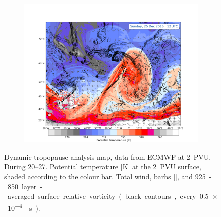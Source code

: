 \begin{figure}
\begin{subfigure}[b]{\textwidth}
		\includegraphics[trim={4.2cm 0cm 4.3cm 36.8cm},clip,
		width=\textwidth]{./fig_DynTropo/20161225_12}
	\end{subfigure}
	\caption{Dynamic tropopause analysis map, data from ECMWF at \SI{2}{PVU}. During \SIrange{20}{27}{\dec}. Potential temperature [K] at the \SI{2}{PVU} surface, shaded according to the colour bar. Total wind, barbs [\SI{}{\mPs}], and \SI{925}-\SI{850}{\hPa} layer-averaged surface relative vorticity (black contours, every \SI{.5e-4}{\per\second}).  }\label{fig:DynTropo}
\end{figure}